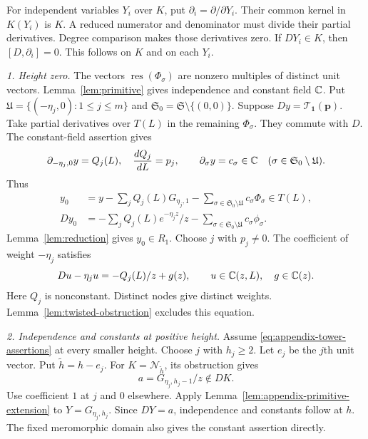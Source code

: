 For independent variables $Y_i$ over $K$, put $\partial_i=\partial/\partial Y_i$.
Their common kernel in $K(Y_i)$ is $K$.
A reduced numerator and denominator must divide their partial derivatives.
Degree comparison makes those derivatives zero.
If $DY_i\in K$, then $[D,\partial_i]=0$.
This follows on $K$ and on each $Y_i$.

\emph{1. Height zero.}
The vectors $\operatorname{res}(\Phi_\sigma)$ are nonzero multiples
of distinct unit vectors.
Lemma~\ref{lem:primitive} gives independence and constant field $\mathbb{C}$.
Put $\mathfrak U=\{(-\eta_j,0):1\le j\le m\}$ and
$\mathfrak S_0=\mathfrak S\setminus\{(0,0)\}$.
Suppose $Dy=\mathcal T_{\mathbf1}(\mathbf p)$.
Take partial derivatives over $T(L)$ in the remaining $\Phi_\sigma$.
They commute with $D$.
The constant-field assertion gives
\[
 \partial_{-\eta_j,0}y=Q_j(L),\quad
 \frac{dQ_j}{dL}=p_j,\qquad
 \partial_\sigma y=c_\sigma\in\mathbb{C}
 \quad(\sigma\in\mathfrak S_0\setminus\mathfrak U).
\]
Thus
\[
\begin{aligned}
 y_0&=y-\sum_jQ_j(L)G_{\eta_j,1}
       -\sum_{\sigma\in\mathfrak S_0\setminus\mathfrak U}
           c_\sigma\Phi_\sigma\in T(L),\\
 Dy_0&=-\sum_jQ_j(L)e^{-\eta_jz}/z
       -\sum_{\sigma\in\mathfrak S_0\setminus\mathfrak U}
           c_\sigma\phi_\sigma.
\end{aligned}
\]
Lemma~\ref{lem:reduction} gives $y_0\in R_1$.
Choose $j$ with $p_j\ne0$.
The coefficient of weight $-\eta_j$ satisfies
\[
 Du-\eta_ju=-Q_j(L)/z+g(z),\qquad
 u\in\mathbb{C}(z,L),\quad g\in\mathbb{C}(z).
\]
Here $Q_j$ is nonconstant.
Distinct nodes give distinct weights.
Lemma~\ref{lem:twisted-obstruction} excludes this equation.

\emph{2. Independence and constants at positive height.}
Assume \eqref{eq:appendix-tower-assertions} at every smaller height.
Choose $j$ with $h_j\ge2$.
Let $e_j$ be the $j$th unit vector.
Put $\widetilde h=h-e_j$.
For $K=\mathcal N_{\widetilde h}$, its obstruction gives
\[
 a=G_{\eta_j,h_j-1}/z\notin DK.
\]
Use coefficient $1$ at $j$ and $0$ elsewhere.
Apply Lemma~\ref{lem:appendix-primitive-extension} to $Y=G_{\eta_j,h_j}$.
Since $DY=a$, independence and constants follow at $h$.
The fixed meromorphic domain also gives the constant assertion directly.

